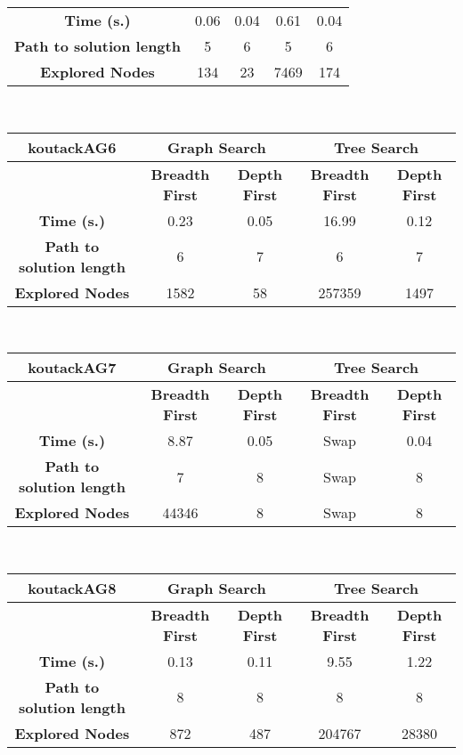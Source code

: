 \begin{description}
\begin{tabular}{|c|c|c|c|c|}
\hline \textbf{Time (s.)} & 0.06 & 0.04 & 0.61 & 0.04\\ \textbf{Path to solution length} & 5 & 6 & 5 & 6 \\ \textbf{Explored Nodes} & 134 & 23 & 7469 & 174\\ 
\hline 
\end{tabular}\\
\begin{tabular}{|c|c|c|c|c|} 
\hline \textbf{koutackAG6} & \multicolumn{2}{|c|}{\textbf{Graph Search}} & \multicolumn{2}{|c|}{\textbf{Tree Search}} \\ \hline & \textbf{Breadth First} &  \textbf{Depth First} & \textbf{Breadth First} &  \textbf{Depth First}\\ 
\hline \textbf{Time (s.)} & 0.23 & 0.05 & 16.99 & 0.12\\ \textbf{Path to solution length} & 6 & 7 & 6 & 7 \\ \textbf{Explored Nodes} & 1582 & 58 & 257359 & 1497\\ 
\hline 
\end{tabular}\\
\begin{tabular}{|c|c|c|c|c|} 
\hline \textbf{koutackAG7} & \multicolumn{2}{|c|}{\textbf{Graph Search}} & \multicolumn{2}{|c|}{\textbf{Tree Search}} \\ \hline & \textbf{Breadth First} &  \textbf{Depth First} & \textbf{Breadth First} &  \textbf{Depth First}\\ 
\hline \textbf{Time (s.)} & 8.87 & 0.05 & Swap & 0.04\\ \textbf{Path to solution length} & 7 & 8 & Swap & 8 \\ \textbf{Explored Nodes} & 44346 & 8 & Swap & 8\\ 
\hline 
\end{tabular}\\
\begin{tabular}{|c|c|c|c|c|} 
\hline \textbf{koutackAG8} & \multicolumn{2}{|c|}{\textbf{Graph Search}} & \multicolumn{2}{|c|}{\textbf{Tree Search}} \\ \hline & \textbf{Breadth First} &  \textbf{Depth First} & \textbf{Breadth First} &  \textbf{Depth First}\\ 
\hline \textbf{Time (s.)} & 0.13 & 0.11 & 9.55 & 1.22\\ \textbf{Path to solution length} & 8 & 8 & 8 & 8 \\ \textbf{Explored Nodes} & 872 & 487 & 204767 & 28380\\ 
\hline 
\end{tabular}\\

\end{description}
